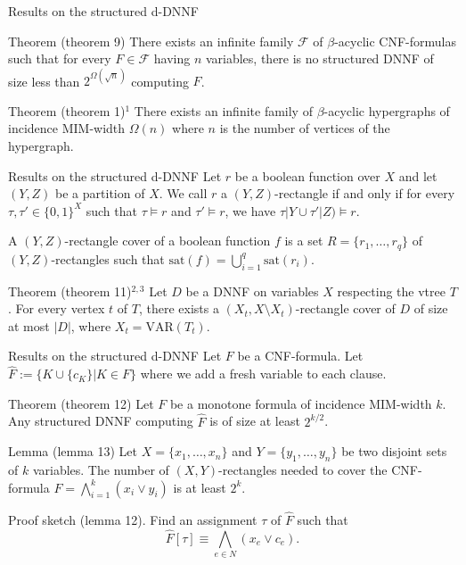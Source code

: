 \begin{frame}[t]{Results on the structured d-DNNF}
	\begin{block}{Theorem (theorem 9)}
		There exists an infinite family $\mathcal{F}$ of $\beta$-acyclic CNF-formulas such that for every $F\in \mathcal{F}$ having $n$ variables, there is no structured DNNF of size less than $2^{\Omega(\sqrt n)}$ computing $F$.
	\end{block}

	\begin{block}{Theorem (theorem 1)$^1$}
		There exists an infinite family of $\beta$-acyclic hypergraphs of incidence MIM-width $\Omega(n)$ where $n$ is the number of vertices of the hypergraph.
	\end{block}
\end{frame}

\begin{frame}[t]{Results on the structured d-DNNF}
	Let $r$ be a boolean function over $X$ and let $(Y, Z)$ be a partition of $X$. We call $r$ a $(Y, Z)$-rectangle if and only if for every $\tau, \tau' \in \{0, 1\}^X$ such that $\tau \models r$ and $\tau' \models r$, we have $\tau|Y \cup \tau'|Z) \models r$.

	A $(Y, Z)$-rectangle cover of a boolean function $f$ is a set $R = \{r_1, \dots, r_q\}$ of $(Y, Z)$-rectangles such that $\mathrm{sat}(f) = \bigcup_{i=1}^q \mathrm{sat}(r_i)$.
	\begin{block}{Theorem (theorem 11)$^{2,3}$}
		Let $D$ be a DNNF on variables $X$ respecting the vtree $T$. For every vertex $t$ of $T$, there exists a $(X_t, X \setminus X_t)$-rectangle cover of $D$ of size at most $|D|$, where $X_t = \mathrm{VAR}(T_t)$.
	\end{block}
\end{frame}

\begin{frame}[t]{Results on the structured d-DNNF}
	Let $F$ be a CNF-formula. Let $\hat{F} := \{K \cup \{c_K\} | K \in F\}$ where we add a fresh variable to each clause.
	\begin{block}{Theorem (theorem 12)}
		Let $F$ be a monotone formula of incidence MIM-width $k$. Any structured DNNF computing $\hat{F}$ is of size at least $2^{k/2}$.
	\end{block}

	\begin{block}{Lemma (lemma 13)}
		Let $X = \{x_1, \dots, x_n\}$ and $Y = \{y_1, \dots, y_n\}$ be two disjoint sets of $k$ variables. The number of $(X, Y)$-rectangles needed to cover the CNF-formula $F = \bigwedge^k_{i=1} (x_i\lor y_i)$ is at least $2^k$.
	\end{block}

	Proof sketch (lemma 12). Find an assignment $\tau$ of $\hat{F}$ such that $$\hat{F}[\tau] \equiv \bigwedge_{e \in N}(x_e \lor c_e).$$
\end{frame}
